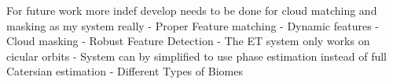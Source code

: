 \label{chap:conclusion}

\label{sec:conclusion}





\label{sec:futurework}

\noindent
For future work more indef develop needs to be done for cloud matching and masking as my system really
- Proper Feature matching
- Dynamic features
- Cloud masking
- Robust Feature Detection
- The ET system only works on cicular orbits
- System can by simplified to use phase estimation instead of full Catersian estimation
- Different Types of Biomes